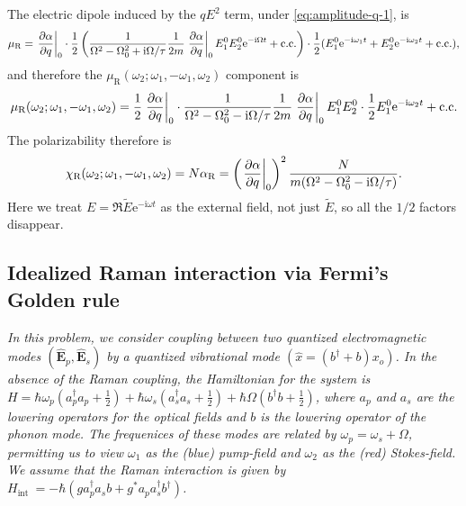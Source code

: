 \documentclass[hyperref, a4paper]{article}
\newcommand*{\ii}{\mathrm{i}}
\newcommand*{\ee}{\mathrm{e}}
\begin{document}
The electric dipole induced by the $qE^2$ term, under \eqref{eq:amplitude-q-1}, is 
\begin{equation}
    \mu_\text{R} = \eval{\pdv{\alpha}{q}}_0 \cdot \frac{1}{2} 
    \left(
        \frac{1}{
            \Omega^2 - \Omega_0^2 + \ii \Omega / \tau 
        } \frac{1}{2m} \eval{\pdv{\alpha}{q}}_0 E_1^0 E_2^0 \ee^{-\ii \Omega t}
        + \text{c.c.} 
    \right)
    \cdot \frac{1}{2} (E_1^0 \ee^{-\ii \omega_1 t} + E_2^0 \ee^{-\ii \omega_2 t} + \text{c.c.}),
\end{equation}
and therefore the $\mu_{\text{R}}(\omega_2; \omega_1, - \omega_1, \omega_2)$ component is 
\begin{equation}
    \mu_{\text{R}}(\omega_2; \omega_1, - \omega_1, \omega_2)
    = \frac{1}{2} \eval{\pdv{\alpha}{q}}_0 \cdot 
    \frac{1}{
        \Omega^2 - \Omega_0^2 - \ii \Omega / \tau 
    } \frac{1}{2m} \eval{\pdv{\alpha}{q}}_0 E_1^0 E_2^0
    \cdot \frac{1}{2} E_1^0 \ee^{- \ii \omega_2 t} + \text{c.c.}
\end{equation}
The polarizability therefore is 
\begin{equation}
    \chi_{\text{R}}(\omega_2; \omega_1, - \omega_1, \omega_2)
    = N \alpha_{\text{R}}
    = \left(\eval{\pdv{\alpha}{q}}_0 \right)^2
    \frac{N}{
        m (\Omega^2 - \Omega_0^2 - \ii \Omega / \tau )
    } .
\end{equation} 
Here we treat $E = \Re \tilde{E} \ee^{- \ii \omega t}$ 
as the external field, not just $\tilde{E}$, 
so all the $1/2$ factors disappear.

\subsection{Idealized Raman interaction via Fermi's Golden rule}

\textit{
    In this problem, we consider coupling between two quantized electromagnetic modes $\left(\hat{\mathbf{E}}_p, \hat{\mathbf{E}}_s\right)$ by a quantized vibrational mode $\left(\hat{x}=\left(b^{\dagger}+b\right) x_o\right)$. In the absence of the Raman coupling, the Hamiltonian for the system is $H=\hbar \omega_p\left(a_p^{\dagger} a_p+\frac{1}{2}\right)+\hbar \omega_s\left(a_s^{\dagger} a_s+\frac{1}{2}\right)+\hbar \Omega\left(b^{\dagger} b+\frac{1}{2}\right)$, where $a_p$ and $a_s$ are the lowering operators for the optical fields and $b$ is the lowering operator of the phonon mode. The frequenices of these modes are related by $\omega_p=\omega_s+\Omega$, permitting us to view $\omega_1$ as the (blue) pump-field and $\omega_2$ as the (red) Stokes-field. We assume that the Raman interaction is given by $H_{\text {int }}=-\hbar\left(g a_p^{\dagger} a_s b+g^* a_p a_s^{\dagger} b^{\dagger}\right)$.
}
\end{document}
